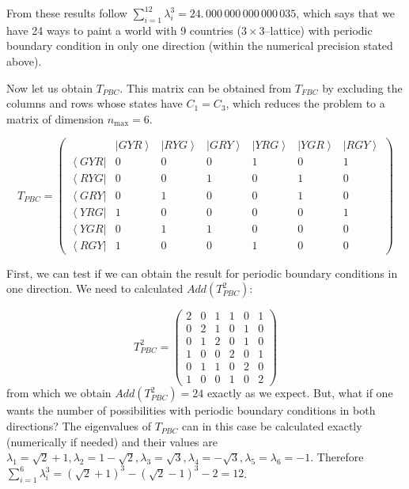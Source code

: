 \documentclass[3p, 10pt, onecolumn]{elsarticle}
\begin{document}
From these results follow $\sum_{i=1}^{12}\lambda _{i}^{3}=24.\,\allowbreak
000\,000\,000\,\allowbreak 000\,035$, which says that we have 24 ways to
paint a world with 9 countries ($3\times 3$--lattice) with periodic boundary
condition in only one direction (within the numerical precision stated
above).

Now let us obtain $T_{PBC}$. This matrix can be obtained from $T_{FBC}$ by
excluding the columns and rows whose states have $C_{1}=C_{3}$, which
reduces the problem to a matrix of dimension $n_{\max }=6$.

\begin{equation}
T_{PBC}=\left( 
\begin{array}{ccccccc}
& \left\vert GYR\right\rangle & \left\vert RYG\right\rangle & \left\vert
GRY\right\rangle & \left\vert YRG\right\rangle & \left\vert YGR\right\rangle
& \left\vert RGY\right\rangle \\ 
\left\langle GYR\right\vert & 0 & 0 & 0 & 1 & 0 & 1 \\ 
\left\langle RYG\right\vert & 0 & 0 & 1 & 0 & 1 & 0 \\ 
\left\langle GRY\right\vert & 0 & 1 & 0 & 0 & 1 & 0 \\ 
\left\langle YRG\right\vert & 1 & 0 & 0 & 0 & 0 & 1 \\ 
\left\langle YGR\right\vert & 0 & 1 & 1 & 0 & 0 & 0 \\ 
\left\langle RGY\right\vert & 1 & 0 & 0 & 1 & 0 & 0%
\end{array}%
\right)
\end{equation}

First, we can test if we can obtain the result for periodic boundary
conditions in one direction. We need to calculated $Add(T_{PBC}^{2})$:

\begin{equation}
T_{PBC}^{2}=\left( 
\begin{array}{cccccc}
2 & 0 & 1 & 1 & 0 & 1 \\ 
0 & 2 & 1 & 0 & 1 & 0 \\ 
0 & 1 & 2 & 0 & 1 & 0 \\ 
1 & 0 & 0 & 2 & 0 & 1 \\ 
0 & 1 & 1 & 0 & 2 & 0 \\ 
1 & 0 & 0 & 1 & 0 & 2%
\end{array}%
\right)
\end{equation}%
\bigskip from which we obtain $Add(T_{PBC}^{2})=24$ exactly as we expect.
But, what if one wants the number of possibilities with periodic boundary
conditions in both directions? The eigenvalues of $T_{PBC}$ can in this case
be calculated exactly (numerically if needed) and their values are $\lambda
_{1}=\sqrt{2}+1,\lambda _{2}=1-\sqrt{2},\lambda _{3}=\sqrt{3},\lambda _{4}=-%
\sqrt{3},\lambda _{5}=\lambda _{6}=-1$. Therefore $\sum_{i=1}^{6}\lambda
_{i}^{3}=\left( \sqrt{2}+1\right) ^{3}-\left( \sqrt{2}-1\right)
^{3}-2=\allowbreak 12$.
\end{document}
